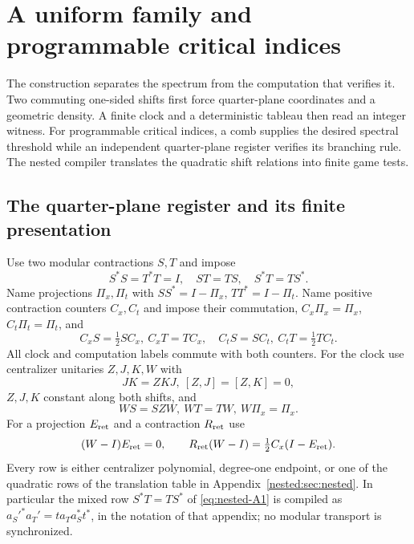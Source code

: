 \section{A uniform family and programmable critical indices}\label{sec:programmable}
The construction separates the spectrum from the computation that verifies it. Two commuting one-sided shifts first force quarter-plane coordinates and a geometric density. A finite clock and a deterministic tableau then read an integer witness. For programmable critical indices, a comb supplies the desired spectral threshold while an independent quarter-plane register verifies its branching rule. The nested compiler translates the quadratic shift relations into finite game tests.

\subsection{The quarter-plane register and its finite presentation}
Use two modular contractions $S,T$ and impose
\begin{equation}
 S^*S=T^*T=I,\quad ST=TS,\quad S^*T=TS^*.
                                                               \label{eq:nested-A1}
\end{equation}
Name projections $\Pi_x,\Pi_t$ with $SS^*=I-\Pi_x$, $TT^*=I-\Pi_t$.
Name positive contraction counters $C_x,C_t$ and impose their
commutation, $C_x\Pi_x=\Pi_x$, $C_t\Pi_t=\Pi_t$, and
\begin{equation}
 C_xS=\tfrac12SC_x,\ C_xT=TC_x,\quad
 C_tS=SC_t,\ C_tT=\tfrac12TC_t.                               \label{eq:nested-A2}
\end{equation}
All clock and computation labels commute with both counters.
For the clock use centralizer unitaries $Z,J,K,W$ with
\[
 JK=ZKJ,\ [Z,J]=[Z,K]=0,
\]
$Z,J,K$ constant along both shifts, and
\[
 WS=SZW,\ WT=TW,\ W\Pi_x=\Pi_x.
\]
For a projection $E_{\rm ret}$ and a contraction $R_{\rm ret}$ use
\begin{equation}
 (W-I)E_{\rm ret}=0,\qquad
 R_{\rm ret}(W-I)=\tfrac12C_x(I-E_{\rm ret}).                 \label{eq:nested-A3}
\end{equation}
Every row is either centralizer polynomial, degree-one endpoint, or one of the quadratic rows of the translation table in Appendix~\ref{nested:sec:nested}. In particular the mixed row $S^*T=TS^*$ of \eqref{eq:nested-A1} is compiled as $a_S'^*a_T'=ta_Ta_S^*t^*$, in the notation of that appendix; no modular transport is synchronized.

